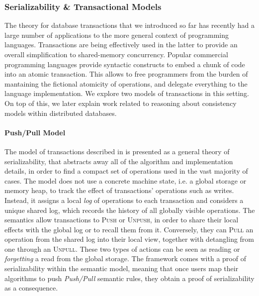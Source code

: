 \tocless\subsubsection{Serializability \& Transactional Models}

\label{sec:serTransMod}

The theory for database transactions that we introduced so far has recently had a large number of applications to the more general context of programming languages. Transactions are being effectively used in the latter to provide an overall simplification to shared-memory concurrency. Popular commercial programming languages provide syntactic constructs to embed a chunk of code into an atomic transaction. This allows to free programmers from the burden of mantaining the fictional atomicity of operations, and delegate everything to the language implementation. We explore two models of transactions in this setting. On top of this, we later explain work related to reasoning about consistency models within distributed databases. \\

\paragraph{Push/Pull Model}
The model of transactions described in \cite{pushPull} is presented as a general theory of serializability, that abstracts away all of the algorithm and implementation details, in order to find a compact set of operations used in the vast majority of cases. The model does not use a concrete machine state, i.e. a global storage or memory heap, to track the effect of transactions' operations such as writes. Instead, it assigns a local \textit{log} of operations to each transaction and considers a unique shared log, which records the history of all globally visible operations. The semantics allow transactions to \textsc{Push} or \textsc{Unpush}, in order to share their local effects with the global log or to recall them from it. Conversely, they can \textsc{Pull} an operation from the shared log into their local view, together with detangling from one through an \textsc{Unpull}. These two types of actions can be seen as reading or \textit{forgetting} a read from the global storage. The framework comes with a proof of serializability within the semantic model, meaning that once users map their algorithms to push \textit{Push/Pull} semantic rules, they obtain a proof of serializability as a consequence.

